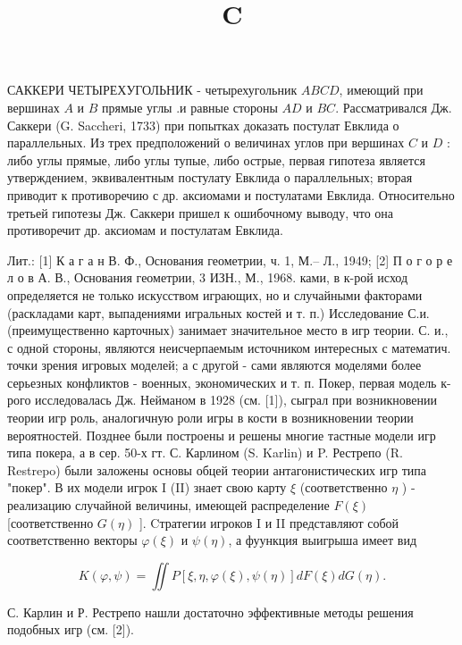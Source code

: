 \documentclass[10pt]{article}
\title{$\mathbf{C}$ }
\author{}
\date{}
\begin{document}
\maketitle

САККЕРИ ЧЕТЫРЕХУГОЛЬНИК - четырехугольник $A B C D$, имеющий при вершинах $A$ и $B$ прямые углы .и равные стороны $A D$ и $B C$. Рассматривался Дж. Саккери (G. Saccheri, 1733) при попытках доказать постулат Евклида о параллельных. Из трех предположений о величинах углов при вершинах $C$ и $D$ : либо углы прямые, либо углы тупые, либо острые, первая гипотеза является утверждением, эквивалентным постулату Евклида о параллельных; вторая приводит к противоречию с др. аксиомами и постулатами Евклида. Относительно третьей гипотезы Дж. Саккери пришел к ошибочному выводу, что она противоречит др. аксиомам и постулатам Евклида.



Лит.: [1] К а г а н В. Ф., Основания геометрии, ч. 1, М.-- Л., 1949; [2] П о г о р е л о в А. В., Основания геометрии, 3 ИЗН., М., 1968. ками, в к-рой исход определяется не только искусством играющих, но и случайными факторами (раскладами карт, выпадениями игральных костей и т. п.) Исследование С.и. (преимущественно карточных) занимает значительное место в игр теории. С. и., с одной стороны, являются неисчерпаемым источником интересных с математич. точки зрения игровых моделей; а с другой - сами являются моделями более серьезных конфликтов - военных, экономических и т. п. Покер, первая модель к-рого исследовалась Дж. Нейманом в 1928 (см. [1]), сыграл при возникновении теории игр роль, аналогичную роли игры в кости в возникновении теории вероятностей. Позднее были построены и решены многие тастные модели игр типа покера, а в сер. 50-х гт. С. Карлином (S. Karlin) и P. Рестрепо (R. Restrepo) были заложены основы обцей теории антагонистических игр типа "покер". В их модели игрок I (II) знает свою карту $\xi$ (соответственно $\eta$ ) - реализацию случайной величины, имеющей распределение $F(\xi)$ [соответственно $G(\eta)$ ]. Cтратегии игроков I и II представляют собой соответственно векторы $\varphi(\xi)$ и $\psi(\eta)$, а фуункция выигрыша имеет вид



\[

K(\varphi, \psi)=\iint P[\xi, \eta, \varphi(\xi), \psi(\eta)] d F(\xi) d G(\eta) .

\]



С. Карлин и Р. Рестрепо нашли достаточно эффективные методы решения подобных игр (см. [2]).
\end{document}
